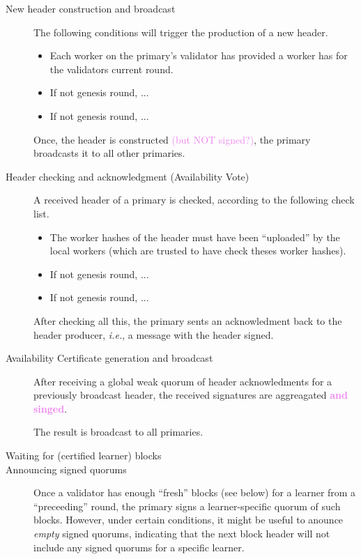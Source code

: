 \documentclass{article}
\theoremstyle{definition}
\newcommand{\tnote}[1]{
  \marginnote{\footnotesize #1}%
}
\newcommand{\ie}[1][]{\emph{i.e.}, }
\begin{document}
\begin{description}
\item[New header construction and broadcast] 
  \tnote{primary\\ ⇒ primary}
  The following conditions will trigger the production of a new header.

  \begin{itemize}
  \item
    Each worker on the primary's validator has provided a
    worker has for the validators current round. 
  \item If not genesis round,
    ... %
  \item 
    If not genesis round,
    ...%
  \end{itemize}

  Once, 
  the header is constructed \textcolor{violet}{(but NOT signed?)}, %
  the primary broadcasts it to all other primaries. 

\item[Header checking and acknowledgment (Availability Vote)]
  A received header of a primary is checked, 
  according to the following check list. 
  
  \begin{itemize}
  \item
    The worker hashes of the header must have been “uploaded”
    by the local workers
    (which are trusted to have check theses worker hashes).
    
  \item If not genesis round,
    ... %
  \item 
    If not genesis round,
    ...%
  \end{itemize}

  After checking all this,
  the primary sents an acknowledment back to the header producer, 
  \ie a message with the header signed. 


\item[Availability Certificate generation and broadcast]
  \tnote{primary\\ ⇒ ∀primary}
  After receiving a global weak quorum of header acknowledments 
  for a previously broadcast header, 
  the received signatures are aggreagated
  \textcolor{violet}{\bf and singed}. %

  The result is broadcast to all primaries. 

\item[Waiting for (certified learner) blocks]

\item[Announcing signed quorums]
  Once a validator has enough 
  “fresh” blocks (see below) for a learner from a “preceeding” round, 
  the primary signs a learner-specific quorum of such blocks.
  However,
  under certain conditions,
  it might be useful to anounce \emph{empty} signed quorums, 
  indicating that the next block header will not include 
  any signed quorums for a specific learner. 
\end{description}
\end{document}
